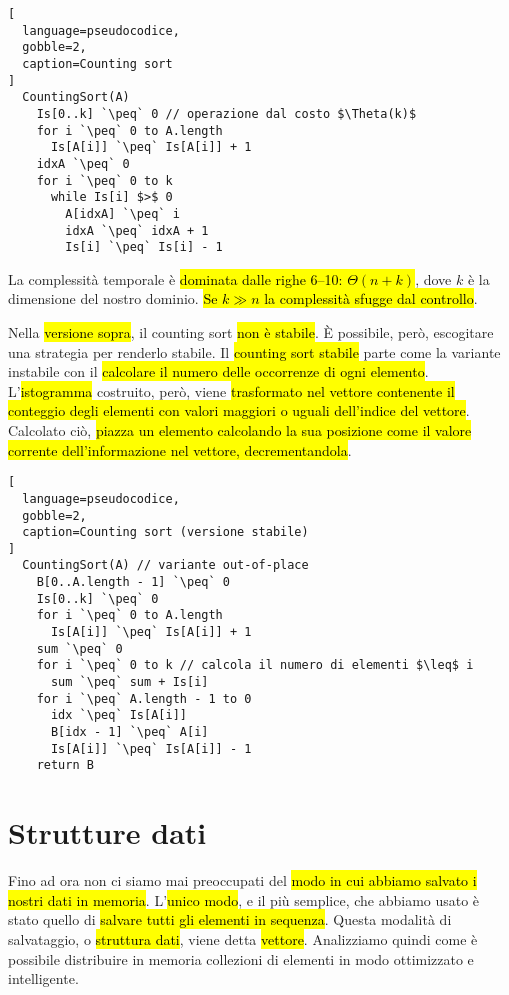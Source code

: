 \documentclass[a4paper,11pt,oneside]{article}
\theoremstyle{plain}
\theoremstyle{definition}
\theoremstyle{remark}
\newcommand{\peq}{$\gets$}
\begin{document}
\begin{lstlisting}[
  language=pseudocodice,
  gobble=2,
  caption=Counting sort
]
  CountingSort(A)
    Is[0..k] `\peq` 0 // operazione dal costo $\Theta(k)$
    for i `\peq` 0 to A.length
      Is[A[i]] `\peq` Is[A[i]] + 1
    idxA `\peq` 0
    for i `\peq` 0 to k
      while Is[i] $>$ 0
        A[idxA] `\peq` i
        idxA `\peq` idxA + 1
        Is[i] `\peq` Is[i] - 1
\end{lstlisting}

La complessità temporale è \hl{dominata dalle righe 6--10: $\Theta(n + k)$},
dove $k$ è la dimensione del nostro dominio. \hl{Se $k \gg n$ la complessità
sfugge dal controllo}.

Nella \hl{versione sopra}, il counting sort \hl{non è stabile}. È possibile,
però, escogitare una strategia per renderlo stabile. Il \hl{counting sort
stabile} parte come la variante instabile con il \hl{calcolare il numero delle
occorrenze di ogni elemento}. L'\hl{istogramma} costruito, però, viene
\hl{trasformato nel vettore contenente il conteggio degli elementi con valori
maggiori o uguali dell'indice del vettore}. Calcolato ciò, \hl{piazza un
elemento calcolando la sua posizione come il valore corrente dell'informazione
nel vettore, decrementandola}.

\begin{lstlisting}[
  language=pseudocodice,
  gobble=2,
  caption=Counting sort (versione stabile)
]
  CountingSort(A) // variante out-of-place
    B[0..A.length - 1] `\peq` 0
    Is[0..k] `\peq` 0
    for i `\peq` 0 to A.length
      Is[A[i]] `\peq` Is[A[i]] + 1
    sum `\peq` 0
    for i `\peq` 0 to k // calcola il numero di elementi $\leq$ i
      sum `\peq` sum + Is[i]
    for i `\peq` A.length - 1 to 0
      idx `\peq` Is[A[i]]
      B[idx - 1] `\peq` A[i]
      Is[A[i]] `\peq` Is[A[i]] - 1
    return B
\end{lstlisting}

\section{Strutture dati}\label{sec:strutture-dati}

Fino ad ora non ci siamo mai preoccupati del \hl{modo in cui abbiamo salvato i
nostri dati in memoria}. L'\hl{unico modo}, e il più semplice, che abbiamo usato
è stato quello di \hl{salvare tutti gli elementi in sequenza}. Questa modalità
di salvataggio, o \hl{struttura dati}, viene detta \hl{vettore}. Analizziamo
quindi come è possibile distribuire in memoria collezioni di elementi in modo
ottimizzato e intelligente.
\end{document}
